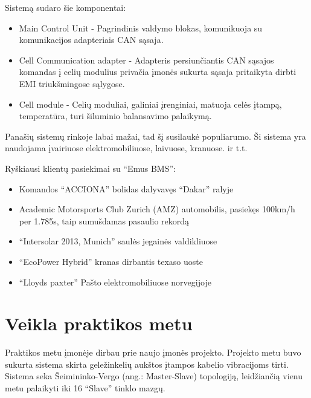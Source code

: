 \documentclass[12pt, a4paper, lithuanian, final]{article}
\begin{document}
Sistemą sudaro šie komponentai:
\begin{itemize}
	\item{Main Control Unit} - Pagrindinis valdymo blokas, komunikuoja su komunikacijos adapteriais CAN sąsaja.
	\item{Cell Communication adapter} - Adapteris persiunčiantis CAN sąsajos komandas į celių modulius privačia įmonės sukurta sąsaja pritaikyta dirbti EMI triukšmingose sąlygose.
	\item{Cell module} - Celių moduliai, galiniai įrenginiai, matuoja celės įtampą, temperatūra, turi šiluminio balansavimo palaikymą.
\end{itemize}

Panašių sistemų rinkoje labai mažai, tad šį susilaukė populiarumo.
Ši sistema yra naudojama įvairiuose elektromobiliuose, laivuose, kranuose. ir t.t.

Ryškiausi klientų pasiekimai su "`Emus BMS"':
\begin{itemize}
	\item Komandos "`ACCIONA"' bolidas dalyvavęs "`Dakar"' ralyje
	\item Academic Motorsports Club Zurich (AMZ) automobilis, pasiekęs 100km/h per 1.785s, taip sumušdamas pasaulio rekordą
	\item "`Intersolar 2013, Munich"' saulės jegainės valdikliuose
	\item "`EcoPower Hybrid"' kranas dirbantis texaso uoste
	\item "`Lloyds paxter"' Pašto elektromobiliuose norvegijoje
\end{itemize}











\section{Veikla praktikos metu}

Praktikos metu įmonėje dirbau prie naujo įmonės projekto.
Projekto metu buvo sukurta sistema skirta geležinkelių aukštos įtampos kabelio vibracijoms tirti.
Sistema seka Šeimininko-Vergo (ang.: Master-Slave) topologiją, leidžiančią vienu metu palaikyti iki 16 "`Slave"' tinklo mazgų.
\end{document}
